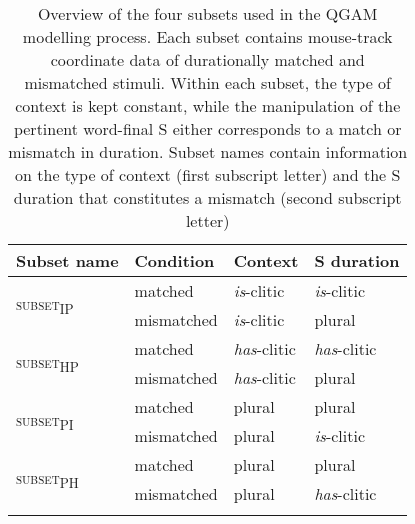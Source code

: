 \begin{table}[H]\fontsize{10}{11}
\caption{Overview of the four subsets used in the QGAM modelling process. Each subset contains mouse-track coordinate data of durationally matched and mismatched stimuli. Within each subset, the type of context is kept constant, while the manipulation of the pertinent word-final S either corresponds to a match or mismatch in duration. Subset names contain information on the type of context (first subscript letter) and the S duration that constitutes a mismatch (second subscript letter)}
\label{tab:8.4}
\centering
\begin{tabular}{llll} 
\lsptoprule
Subset name               & Condition  & Context             & S duration           \\ 
\midrule
\multirow{2}{*}{\textsc{subset\textsubscript{IP}}} & matched    & \textit{is}-clitic  & \textit{is}-clitic   \\
                          & mismatched & \textit{is}-clitic  & plural               \\ 
\midrule
\multirow{2}{*}{\textsc{subset\textsubscript{HP}}} & matched    & \textit{has}-clitic & \textit{has}-clitic  \\
                          & mismatched & \textit{has}-clitic & plural               \\ 
\midrule
\multirow{2}{*}{\textsc{subset\textsubscript{PI}}} & matched    & plural              & plural               \\
                          & mismatched & plural              & \textit{is}-clitic   \\ 
\midrule
\multirow{2}{*}{\textsc{subset\textsubscript{PH}}} & matched    & plural              & plural               \\
                          & mismatched & plural              & \textit{has}-clitic  \\
\lspbottomrule
\end{tabular}
\end{table}






